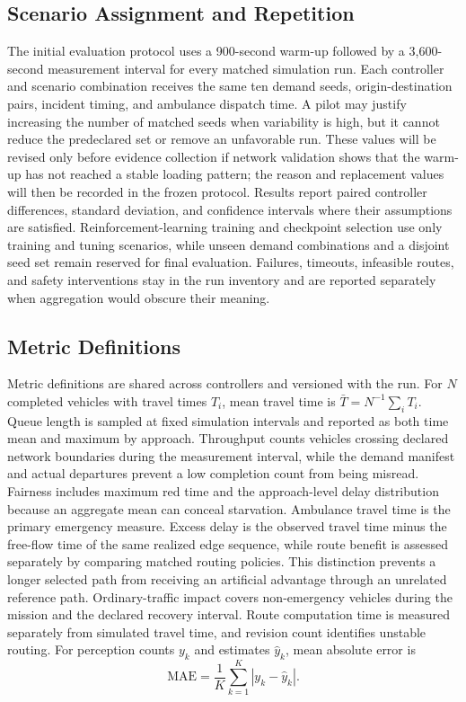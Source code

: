 \subsection{Scenario Assignment and Repetition}

The initial evaluation protocol uses a 900-second warm-up followed by a 3,600-second measurement interval for every matched simulation run. Each controller and scenario combination receives the same ten demand seeds, origin-destination pairs, incident timing, and ambulance dispatch time. A pilot may justify increasing the number of matched seeds when variability is high, but it cannot reduce the predeclared set or remove an unfavorable run. These values will be revised only before evidence collection if network validation shows that the warm-up has not reached a stable loading pattern; the reason and replacement values will then be recorded in the frozen protocol. Results report paired controller differences, standard deviation, and confidence intervals where their assumptions are satisfied. Reinforcement-learning training and checkpoint selection use only training and tuning scenarios, while unseen demand combinations and a disjoint seed set remain reserved for final evaluation. Failures, timeouts, infeasible routes, and safety interventions stay in the run inventory and are reported separately when aggregation would obscure their meaning.

\subsection{Metric Definitions}

Metric definitions are shared across controllers and versioned with the run. For $N$ completed vehicles with travel times $T_i$, mean travel time is $\bar{T}=N^{-1}\sum_iT_i$. Queue length is sampled at fixed simulation intervals and reported as both time mean and maximum by approach. Throughput counts vehicles crossing declared network boundaries during the measurement interval, while the demand manifest and actual departures prevent a low completion count from being misread. Fairness includes maximum red time and the approach-level delay distribution because an aggregate mean can conceal starvation. Ambulance travel time is the primary emergency measure. Excess delay is the observed travel time minus the free-flow time of the same realized edge sequence, while route benefit is assessed separately by comparing matched routing policies. This distinction prevents a longer selected path from receiving an artificial advantage through an unrelated reference path. Ordinary-traffic impact covers non-emergency vehicles during the mission and the declared recovery interval. Route computation time is measured separately from simulated travel time, and revision count identifies unstable routing. For perception counts $y_k$ and estimates $\hat{y}_k$, mean absolute error is
\begin{equation}
\mathrm{MAE}=\frac{1}{K}\sum_{k=1}^{K}|y_k-\hat{y}_k|.
\end{equation}

